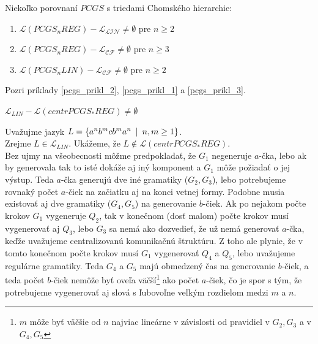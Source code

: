 \begin{veta}
Niekoľko porovnaní $PCGS$ s triedami Chomského hierarchie:
\begin{enumerate}
  \item $\mathcal{L}(PCGS_nREG)-\mathcal{L_{LIN}}\neq\emptyset$ pre $n\geq 2$
  \item $\mathcal{L}(PCGS_nREG)-\mathcal{L_{CF}}\neq\emptyset$ pre $n\geq 3$
  \item $\mathcal{L}(PCGS_nLIN)-\mathcal{L_{CF}}\neq\emptyset$ pre $n\geq 2$
\end{enumerate}
\end{veta}

\begin{dokaz}
Pozri príklady \ref{pcgs_prikl_2}, \ref{pcgs_prikl_1} a \ref{pcgs_prikl_3}.
\end{dokaz}

\begin{veta}
\label{pcgs_veta_LLINtoLcentrPCGS*REG}
$\mathcal{L}_{LIN}-\mathcal{L}(centrPCGS_*REG)\neq\emptyset$
\end{veta}

\begin{dokaz}
Uvažujme jazyk $L=\{a^nb^mcb^ma^n\enspace |\enspace n,m\geq 1\}$. \\ Zrejme
$L\in\mathcal{L}_{LIN}$. Ukážeme, že
$L\not\in\mathcal{L}(centrPCGS_*REG)$. \\ Bez ujmy na všeobecnosti
môžme predpokladať, že $G_1$ negeneruje $a$-čka, lebo ak by
generovala tak to isté dokáže aj iný komponent a $G_1$ môže
požiadať o jej výstup. Teda $a$-čka generujú dve iné gramatiky
($G_2,G_3$), lebo potrebujeme rovnaký počet $a$-čiek na začiatku
aj na konci vetnej formy. Podobne musia existovať aj dve gramatiky
($G_4,G_5$) na generovanie $b$-čiek. Ak po nejakom počte krokov
$G_1$ vygeneruje $Q_2$, tak v konečnom (dosť malom) počte krokov
musí vygenerovať aj $Q_3$, lebo $G_3$ sa nemá ako dozvedieť, že už
nemá generovať $a$-čka, keďže uvažujeme centralizovanú komunikačnú
štruktúru. Z toho ale plynie, že v tomto konečnom počte krokov
musí $G_1$ vygenerovať $Q_4$ a $Q_5$, lebo uvažujeme regulárne
gramatiky. Teda $G_4$ a $G_5$ majú obmedzený čas na generovanie
$b$-čiek, a teda počet $b$-čiek nemôže byť oveľa
väčší\footnote{$m$ môže byť väčšie od $n$ najviac lineárne v
závislosti od pravidiel v $G_2,G_3$ a v $G_4,G_5$} ako počet
$a$-čiek, čo je spor s tým, že potrebujeme vygenerovať aj slová s
ľubovoľne veľkým rozdielom medzi $m$ a $n$.
\end{dokaz}

\pagebreak

